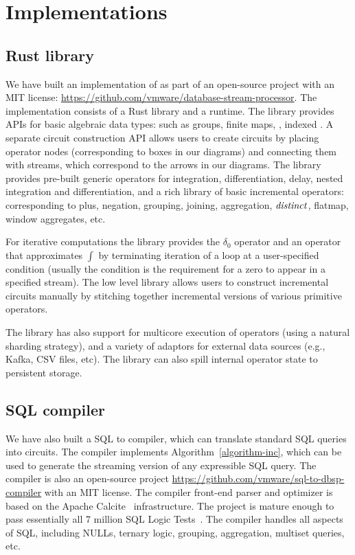 \section{Implementations}\label{sec:implementation}

\subsection{\dbsp Rust library}

We have built an implementation of \dbsp as part of an open-source
project with an MIT license:
\url{https://github.com/vmware/database-stream-processor}.
The implementation consists of a Rust library and a runtime.  The
library provides APIs for basic algebraic data types: such as groups,
finite maps, \zr, indexed \zr.  A separate circuit construction API
allows users to create \dbsp circuits by placing operator nodes
(corresponding to boxes in our diagrams) and connecting them with
streams, which correspond to the arrows in our diagrams.  The library
provides pre-built generic operators for integration, differentiation,
delay, nested integration and differentiation, and a rich library of
\zr basic incremental operators: corresponding to plus, negation,
grouping, joining, aggregation, $\mathit{distinct}$, flatmap, window
aggregates, etc.

For iterative computations the library provides the $\delta_0$
operator and an operator that approximates $\int$ by terminating
iteration of a loop at a user-specified condition (usually the
condition is the requirement for a zero to appear in a specified
stream).  The low level library allows users to construct incremental
circuits manually by stitching together incremental versions of
various primitive operators.

The library has also support for multicore execution of \zr operators
(using a natural sharding strategy), and a variety of adaptors for
external data sources (e.g., Kafka, CSV files, etc).  The library can
also spill internal operator state to persistent storage.

\subsection{SQL compiler}

We have also built a SQL to \dbsp compiler, which can translate
standard SQL queries into \dbsp circuits.  The compiler implements
Algorithm~\ref{algorithm-inc}, which can be used to generate the
streaming version of any expressible SQL query.  The compiler is also
an open-source project
\url{https://github.com/vmware/sql-to-dbsp-compiler} with an MIT
license.  The compiler front-end parser and optimizer is based on the
Apache Calcite~\cite{begoli-icmd18} infrastructure.  The project is
mature enough to pass essentially all 7 million SQL Logic
Tests~\cite{sqllogictest}.  The compiler handles all aspects of SQL,
including NULLs, ternary logic, grouping, aggregation, multiset
queries, etc.

